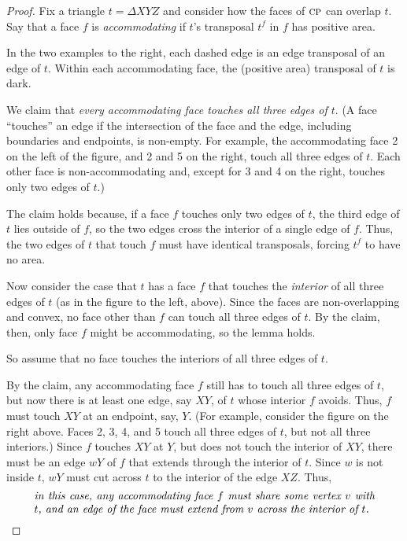 \documentclass[final]{siamltex}
\newcommand{\transposal}[2]{{#1}^{#2}}
\newcommand{\face}{f}
\newcommand{\tri}{t}  \newcommand{\vertex}{v}
\newcommand{\Picture}[1]{}
\newcommand{\xfigpdf}[1]{\Picture{#1.pdf_t}}
\newcommand{\xfig}[1]{\xfigpdf{#1}}
\begin{document}
\begin{proof}
Fix a triangle $\tri=\Delta{X Y Z}$ and consider how the faces of $\text{\sc cp}$ can overlap $\tri$.
Say that a face $\face$ is {\em accommodating} if $\tri$'s transposal $\transposal{\tri}{\face}$ in $\face$ has positive area.

\begin{window}[0,r,{\scalebox{.5}{\xfig{transposal-configs}}},{}]
  In the two examples to the right,
  each dashed edge is an edge transposal of an edge of $\tri$.
  Within each accommodating face, the (positive area) transposal of $\tri$ is dark.

  \hspace*{\parindent}We claim that {\em every accommodating face touches all three edges of $\tri$}.
  (A face ``touches'' an edge if the intersection of the face and the edge,
  including boundaries and endpoints, is non-empty.
  For example, the accommodating face 2 on the left of the figure, and 2 and 5 on the right, 
  touch all three edges of $\tri$.  
  Each other face is non-accommodating and, 
  except for 3 and 4 on the right, touches only two edges of $\tri$.)
\end{window}

The claim holds because, if a face $\face$ touches only two edges of $\tri$,
the third edge of $\tri$ lies outside of $\face$,
so the two edges cross the interior of a single edge of $\face$.
Thus, the two edges of $\tri$ that touch $\face$ must have identical transposals,
forcing $\transposal{\tri}{\face}$ to have no area.

Now consider the case that $\tri$ has a face $\face$ that touches the {\em interior}
of all three edges of $\tri$ (as in the figure to the left, above).
Since the faces are non-overlapping and convex,
no face other than $\face$ can touch all three edges of $\tri$.
By the claim, then, only face $\face$ might be accommodating, so the lemma holds.

So assume that no face touches the interiors of all three edges of $\tri$.

By the claim, any accommodating face $\face$ still has to touch all three edges of $\tri$,
but now there is at least one edge, say $X Y$, of $\tri$ whose interior $\face$ avoids.
Thus, $\face$ must touch $X Y$ at an endpoint, say, $Y$.
(For example, consider the figure on the right above.
Faces 2, 3, 4, and 5 touch all three edges of $\tri$, but not all three interiors.)
Since $\face$ touches $X Y$ at $Y$, but does not touch the interior of $X Y$,
there must be an edge $w Y$ of $\face$ that extends through the interior of $\tri$.
Since $w$ is not inside $\tri$, $w Y$ must cut across $\tri$ to the interior of the edge $X Z$.
Thus, 
\begin{equation}\label{eqn:quote}
  {\parbox{0.9\textwidth}{\em in this case, any accommodating face $\face$ must share some vertex $\vertex$ with $\tri$,
and an edge of the face must extend from $\vertex$ across the interior of $\tri$.}}
\end{equation}


\end{proof}
\end{document}
